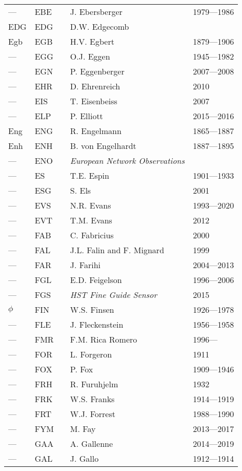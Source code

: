 \begin{longtable}{l|l|c|p{59mm}|l}
--- & EBE &   & J. Ebersberger & 1979---1986 \\
EDG & EDG &   & D.W. Edgecomb & \\
Egb & EGB &   & H.V. Egbert & 1879---1906 \\
--- & EGG &   & O.J. Eggen & 1945---1982 \\
--- & EGN &   & P. Eggenberger & 2007---2008 \\
--- & EHR &   & D. Ehrenreich & 2010 \\
--- & EIS &   & T. Eisenbeiss & 2007 \\
--- & ELP &   & P. Elliott & 2015---2016 \\
Eng & ENG &   & R. Engelmann & 1865---1887 \\
Enh & ENH &   & B. von Engelhardt & 1887---1895 \\
--- & ENO &   & \emph{European Network Observations} & \\
--- & ES  &   & T.E. Espin & 1901---1933 \\
--- & ESG &   & S. Els & 2001 \\
--- & EVS &   & N.R. Evans & 1993---2020 \\
--- & EVT &   & T.M. Evans & 2012 \\\midrule
--- & FAB &   & C. Fabricius & 2000 \\
--- & FAL &   & J.L. Falin and F. Mignard & 1999 \\
--- & FAR &   & J. Farihi & 2004---2013 \\
--- & FGL &   & E.D. Feigelson & 1996---2006 \\
--- & FGS &   & \emph{HST Fine Guide Sensor} & 2015 \\
$\phi$ & FIN &   & W.S. Finsen & 1926---1978 \\
--- & FLE &   & J. Fleckenstein & 1956---1958 \\
--- & FMR &   & F.M. Rica Romero & 1996--- \\
--- & FOR &   & L. Forgeron & 1911 \\
--- & FOX &   & P. Fox & 1909---1946 \\
--- & FRH &   & R. Furuhjelm & 1932 \\
--- & FRK &   & W.S. Franks & 1914---1919 \\
--- & FRT &   & W.J. Forrest & 1988---1990 \\
--- & FYM &   & M. Fay & 2013---2017 \\\midrule
--- & GAA &   & A. Gallenne & 2014---2019 \\
--- & GAL &   & J. Gallo & 1912---1914 \\

\end{longtable}

